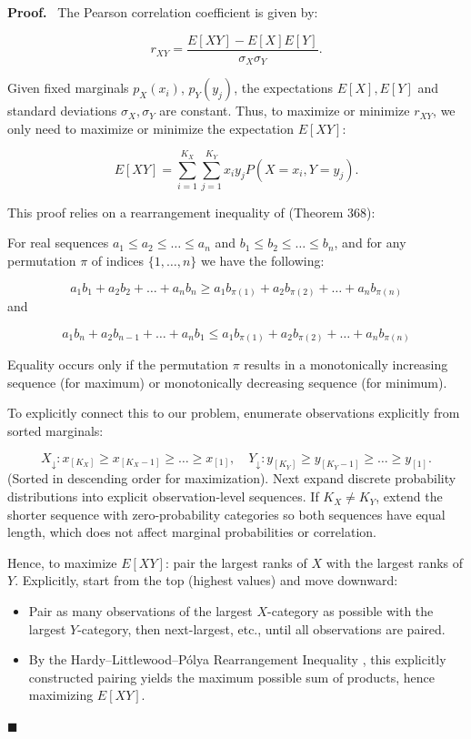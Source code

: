 \documentclass[
  12pt,
]{article}
\theoremstyle{plain}
\theoremstyle{definition}
\renewenvironment{proof}
   {\par\noindent\textbf{Proof.}\ }
   {\hfill$\blacksquare$\par}
\theoremstyle{remark}
\begin{document}
\begin{proof}
The Pearson correlation coefficient is given by:

\[r_{XY} = \frac{E[XY] - E[X]E[Y]}{\sigma_X \sigma_Y}.\]

Given fixed marginals \(p_X(x_i)\), \(p_Y(y_j)\), the expectations
\(E[X], E[Y]\) and standard deviations \(\sigma_X, \sigma_Y\) are
constant. Thus, to maximize or minimize \(r_{XY}\), we only need to
maximize or minimize the expectation \(E[XY]\):

\[E[XY] = \sum_{i=1}^{K_X}\sum_{j=1}^{K_Y} x_i y_j P(X = x_i, Y = y_j).\]

This proof relies on a rearrangement inequality of
\autocite{hard52-inequalities} (Theorem 368):

For real sequences \(a_1 \leq a_2 \leq \dots \leq a_n\) and
\(b_1 \leq b_2 \leq \dots \leq b_n\), and for any permutation \(\pi\) of
indices \(\{1,\dots,n\}\) we have the following:

\[a_1 b_1 + a_2 b_2 + \dots + a_n b_n \geq a_1 b_{\pi(1)} + a_2 b_{\pi(2)} + \dots + a_n b_{\pi(n)}\]
and

\[a_1 b_n + a_2 b_{n-1} + \dots + a_n b_1 \leq a_1 b_{\pi(1)} + a_2 b_{\pi(2)} + \dots + a_n b_{\pi(n)}\]

Equality occurs only if the permutation \(\pi\) results in a
monotonically increasing sequence (for maximum) or monotonically
decreasing sequence (for minimum).

To explicitly connect this to our problem, enumerate observations
explicitly from sorted marginals:

\[
X_{\downarrow}: x_{[K_X]} \geq x_{[K_X-1]} \geq \dots \geq x_{[1]}, \quad  
        Y_{\downarrow}: y_{[K_Y]} \geq y_{[K_Y-1]} \geq \dots \geq y_{[1]}.
\] (Sorted in descending order for maximization). Next expand discrete
probability distributions into explicit observation-level sequences. If
\(K_X \neq K_Y\), extend the shorter sequence with zero-probability
categories so both sequences have equal length, which does not affect
marginal probabilities or correlation.

Hence, to maximize \(E[XY]\): pair the largest ranks of \(X\) with the
largest ranks of \(Y\). Explicitly, start from the top (highest values)
and move downward:

\begin{itemize}
\item
  Pair as many observations of the largest \(X\)-category as possible
  with the largest \(Y\)-category, then next-largest, etc., until all
  observations are paired.
\item
  By the Hardy--Littlewood--Pólya Rearrangement Inequality
  \autocite{hard52-inequalities}, this explicitly constructed pairing
  yields the maximum possible sum of products, hence maximizing
  \(E[XY]\).
\end{itemize}


\end{proof}
\end{document}
